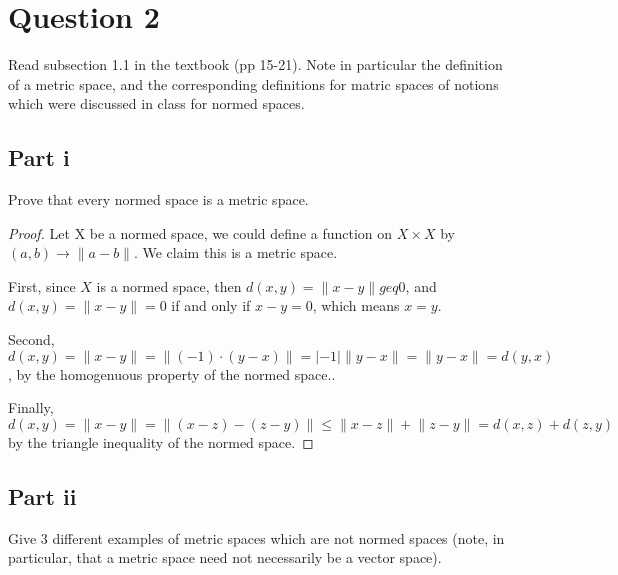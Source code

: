 \section{Question 2}

\begin{question}
    Read subsection 1.1 in the textbook (pp 15-21). Note in particular the definition of a metric space, and the corresponding definitions for matric spaces of notions which were discussed in class for normed spaces.
\end{question}

\subsection{Part i}

\begin{question}
   Prove that every normed space is a metric space.
\end{question}

\begin{answer}
    \begin{proof}
        Let X be a normed space, we could define a function on $X \times X$ by $(a, b) \rightarrow\|a-b\|$. We claim this is a metric space.

        First, since $X$ is a normed space, then $d(x,y) = \lVert x - y \rVert geq 0$, and $d(x,y) = \lVert x - y \rVert = 0$ if and only if $x -y = 0$, which means $x = y$.
        
        Second, $d(x,y) = \lVert x - y \rVert = \lVert (-1)\cdot (y-x) \rVert = \lvert -1 \rvert \lVert y - x \rVert = \lVert y - x \rVert = d(y,x)$, by the homogenuous property of the normed space..
        
        Finally, $d(x,y) = \lVert x - y \rVert = \lVert (x-z)-(z-y)\rVert \leq \lVert x - z \rVert + \lVert z - y \rVert = d(x,z)+ d(z,y)$ by the triangle inequality of the normed space.
    \end{proof}
\end{answer}

\subsection{Part ii}

\begin{question}
    Give 3 different examples of metric spaces which are not normed spaces (note, in particular, that a metric space need not necessarily be a vector space).
\end{question}

